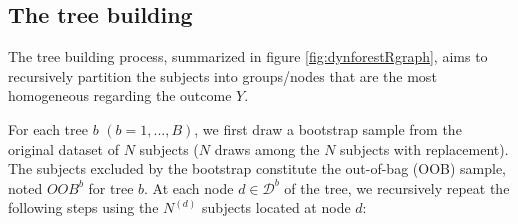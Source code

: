 \subsection{The tree building}\label{the-tree-building}

The tree building process, summarized in figure \ref{fig:dynforestRgraph}, aims to recursively partition the subjects into groups/nodes that are the most homogeneous regarding the outcome \(Y\).

For each tree \(b\) \((b = 1, ..., B)\), we first draw a bootstrap sample from the original dataset of \(N\) subjects (\(N\) draws among the \(N\) subjects with replacement). The subjects excluded by the bootstrap constitute the out-of-bag (OOB) sample, noted \(OOB^b\) for tree \(b\). At each node \(d \in \mathcal{D}^b\) of the tree, we recursively repeat the following steps using the \(N^{(d)}\) subjects located at node \(d\):

